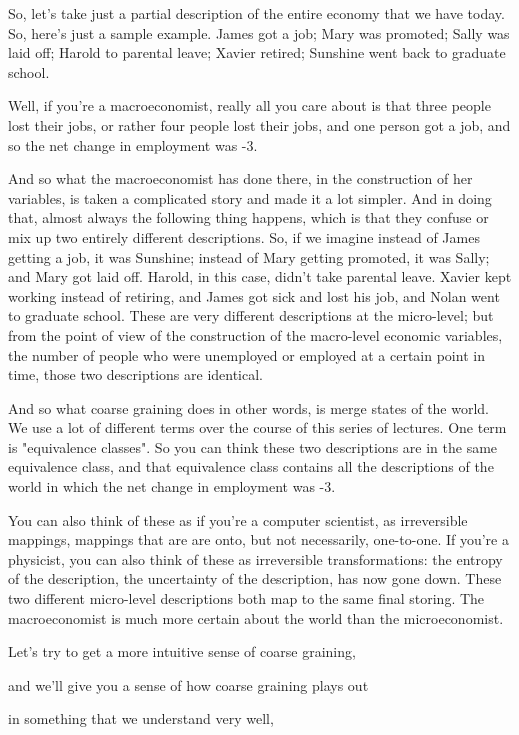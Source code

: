 \documentclass[]{article}
\begin{document}
So, let's take just a partial description
of the entire economy that we have today.
So, here's just a sample example.
James got a job; Mary was promoted;
Sally was laid off;
Harold to parental leave; Xavier retired;
Sunshine went back to graduate school.

Well, if you're a macroeconomist,
really all you care about
is that three people lost their jobs,
or rather four people lost their jobs,
and one person got a job,
and so the net change
in employment was -3.

And so what the macroeconomist
has done there,
in the construction of her variables,
is taken a complicated story
and made it a lot simpler.
And in doing that, almost always
the following thing happens,
which is that they confuse or mix up
two entirely different descriptions.
So, if we imagine instead of
James getting a job, it was Sunshine;
instead of Mary
getting promoted, it was Sally;
and Mary got laid off.
Harold, in this case,
didn't take parental leave.
Xavier kept working instead of retiring,
and James got sick and lost his job,
and Nolan went to graduate school.
These are very different descriptions
at the micro-level;
but from the point of view
of the construction
of the macro-level economic variables,
the number of people
who were unemployed or employed
at a certain point in time,
those two descriptions are identical.

And so what coarse graining
does in other words,
is merge states of the world.
We use a lot of different terms
over the course
of this series of lectures.
One term is "equivalence classes".
So you can think these two descriptions
are in the same 
equivalence class,
and that equivalence class
contains all the descriptions of the world
in which the net change
in employment was -3.

You can also think of these
as if you're a computer scientist,
as irreversible mappings,
mappings that are are onto,
but not necessarily, one-to-one.
If you're a physicist, 
you can also think of these
as irreversible transformations:
the entropy of the description,
the uncertainty of the description,
has now gone down.
These two different
micro-level descriptions
both map to the same final storing.
The macroeconomist is much more certain
about the world than the microeconomist.

Let's try to get a more intuitive sense
of coarse graining,

and we'll give you a sense
of how coarse graining plays out

in something that we understand very well,
\end{document}
